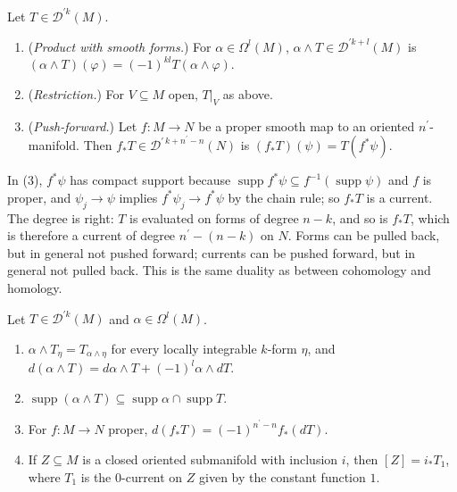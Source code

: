 \begin{definition}\label{de-rham:definition-current-operations}
Let $T \in \mathcal{D}^{\prime k}(M)$.
\begin{enumerate}
\item (\emph{Product with smooth forms.}) For $\alpha \in \Omega^l(M)$, $\alpha \wedge T \in \mathcal{D}^{\prime k+l}(M)$ is $(\alpha \wedge T)(\varphi) = (-1)^{kl}T(\alpha \wedge \varphi)$.
\item (\emph{Restriction.}) For $V \subseteq M$ open, $T|_V$ as above.
\item (\emph{Push-forward.}) Let $f \colon M \to N$ be a proper smooth map to an oriented $n^{\prime}$-manifold. Then $f_*T \in \mathcal{D}^{\prime\, k + n^{\prime} - n}(N)$ is $(f_*T)(\psi) = T(f^*\psi)$.
\end{enumerate}
\end{definition}

In (3), $f^*\psi$ has compact support because $\operatorname{supp}f^*\psi \subseteq f^{-1}(\operatorname{supp}\psi)$ and $f$ is proper, and $\psi_j \to \psi$ implies $f^*\psi_j \to f^*\psi$ by the chain
rule; so $f_*T$ is a current. The degree is right: $T$ is evaluated on forms of degree $n - k$, and so is $f_*T$, which is therefore a current of degree $n^{\prime} - (n - k)$ on $N$. Forms can be pulled
back, but in general not pushed forward; currents can be pushed forward, but in general not pulled back. This is the same duality as between cohomology and homology.

\begin{proposition}\label{de-rham:proposition-current-operations}
Let $T \in \mathcal{D}^{\prime k}(M)$ and $\alpha \in \Omega^l(M)$.
\begin{enumerate}
\item $\alpha \wedge T_\eta = T_{\alpha \wedge \eta}$ for every locally integrable $k$-form $\eta$, and $d(\alpha \wedge T) = d\alpha \wedge T + (-1)^l\alpha \wedge dT$.
\item $\operatorname{supp}(\alpha \wedge T) \subseteq \operatorname{supp}\alpha \cap \operatorname{supp}T$.
\item For $f \colon M \to N$ proper, $d(f_*T) = (-1)^{n^{\prime} - n}f_*(dT)$.
\item If $Z \subseteq M$ is a closed oriented submanifold with inclusion $i$, then $[Z] = i_*T_1$, where $T_1$ is the $0$-current on $Z$ given by the constant function $1$.
\end{enumerate}
\end{proposition}

